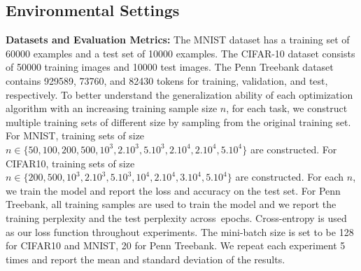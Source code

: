 \documentclass[11pt]{article}
\begin{document}
\vspace{-0.15in}
\subsection{Environmental Settings}
\vspace{-0.05in}


\textbf{Datasets and Evaluation Metrics:}  The MNIST dataset has a training set of 60000 examples and a test set of 10000 examples. The CIFAR-10 dataset consists of 50000 
training images and 10000 test images. The Penn Treebank dataset contains 929589, 73760, and 82430 tokens for training, validation, and test,  respectively.
To better understand the generalization ability of each optimization algorithm with an increasing training sample size $n$, for each task, we construct multiple training sets of different size by sampling from the original training set. For MNIST, training sets of size $n \in \{50, 100, 200, 500, 10^3, 2.10^3, 5.10^3, 2.10^4, 2.10^4, 5.10^4 \}$ are constructed. For CIFAR10, training sets of size $n \in \{ 200, 500, 10^3, 2.10^3, 5.10^3, 10^4, 2.10^4,3.10^4, 5.10^4\}$ are constructed. 
For each $n$, we train the model and report the loss and accuracy on the test set.  
For Penn Treebank, all training samples are used to train the model and we report the training perplexity and the test perplexity across~epochs. 
Cross-entropy is used as our loss function throughout experiments. The mini-batch size is set to be 128 for CIFAR10 and MNIST, 20 for Penn Treebank. 
We repeat each experiment 5 times and report the mean and standard deviation of the results.
\end{document}
